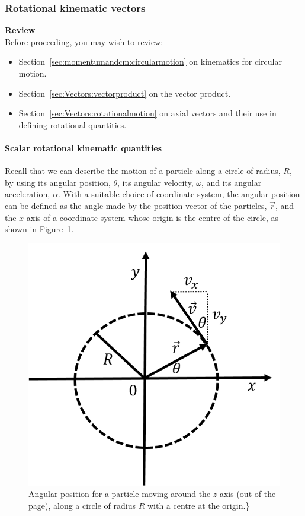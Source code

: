 \subsubsection{Rotational kinematic vectors}

\begin{framed}
\textbf{Review}\\
Before proceeding, you may wish to review:

\begin{itemize}
\item Section~\ref{sec:momentumandcm:circularmotion} on kinematics for circular motion.
\item Section~\ref{sec:Vectors:vectorproduct} on the vector product.
\item Section~\ref{sec:Vectors:rotationalmotion} on axial vectors and their use in defining rotational quantities.
\end{itemize}
\end{framed}

\paragraph{Scalar rotational kinematic quantities}

Recall that we can describe the motion of a particle along a circle of radius, $R$, by using its angular position, $\theta$, its angular velocity, $\omega$, and its angular acceleration, $\alpha$. With a suitable choice of coordinate system, the angular position can be defined as the angle made by the position vector of the particles, $\vec r$, and the $x$ axis of a coordinate system whose origin is the centre of the circle, as shown in Figure~\ref{fig_rotationaldynamics_vcircle}.

\begin{figure}[!htbp]
\centering
\includegraphics[width=0.375\linewidth]{files/vcircle-84a2b9eb9617dd4b79c73a0e096f77a8.png}
\caption[]{Angular position for a particle moving around the $z$ axis (out of the page), along a circle of radius $R$ with a centre at the origin.\}}
\label{fig_rotationaldynamics_vcircle}
\end{figure}

